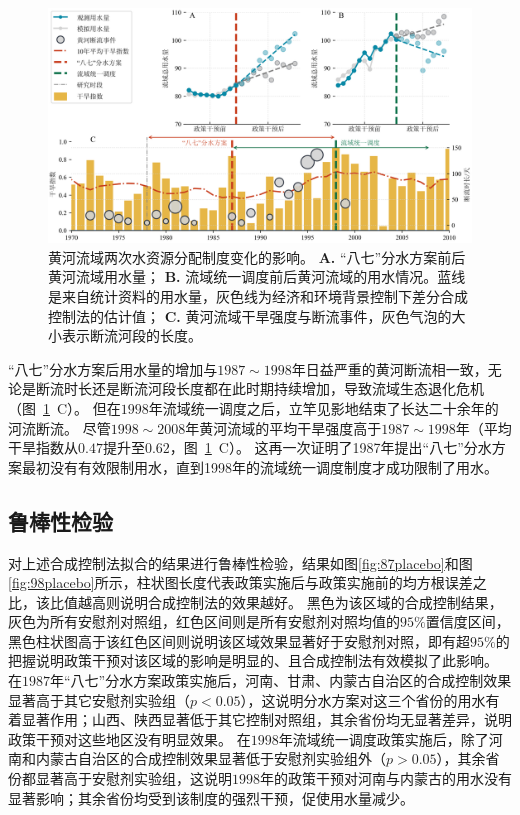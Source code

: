 \begin{figure}[!htb]
	\centering
	\includegraphics[width=\linewidth]{img/ch5/ch5_results.png}
	\caption[黄河流域两次水资源分配制度变化的影响]{
        黄河流域两次水资源分配制度变化的影响。
        \textbf{A.} “八七”分水方案前后黄河流域用水量；
        \textbf{B.} 流域统一调度前后黄河流域的用水情况。蓝线是来自统计资料的用水量，灰色线为经济和环境背景控制下差分合成控制法的估计值；
        \textbf{C.} 黄河流域干旱强度与断流事件，灰色气泡的大小表示断流河段的长度。
	}\label{ch5:fig:main_results}
\end{figure}

“八七”分水方案后用水量的增加与$1987 \sim 1998$年日益严重的黄河断流相一致，无论是断流时长还是断流河段长度都在此时期持续增加，导致流域生态退化危机（图~\ref{ch5:fig:main_results}~C）。
但在$1998$年流域统一调度之后，立竿见影地结束了长达二十余年的河流断流。
尽管$1998 \sim 2008$年黄河流域的平均干旱强度高于$1987 \sim 1998$年（平均干旱指数从$0.47$提升至$0.62$，图~\ref{ch5:fig:main_results}~C）。
这再一次证明了1987年提出“八七”分水方案最初没有有效限制用水，直到1998年的流域统一调度制度才成功限制了用水。

\subsection{鲁棒性检验}

对上述合成控制法拟合的结果进行鲁棒性检验，结果如图\ref{fig:87placebo}和图\ref{fig:98placebo}所示，柱状图长度代表政策实施后与政策实施前的均方根误差之比，该比值越高则说明合成控制法的效果越好。
黑色为该区域的合成控制结果，灰色为所有安慰剂对照组，红色区间则是所有安慰剂对照均值的$95\%$置信度区间，黑色柱状图高于该红色区间则说明该区域效果显著好于安慰剂对照，即有超$95\%$的把握说明政策干预对该区域的影响是明显的、且合成控制法有效模拟了此影响。
在$1987$年“八七”分水方案政策实施后，河南、甘肃、内蒙古自治区的合成控制效果显著高于其它安慰剂实验组（$p < 0.05$），这说明分水方案对这三个省份的用水有着显著作用；山西、陕西显著低于其它控制对照组，其余省份均无显著差异，说明政策干预对这些地区没有明显效果。
在$1998$年流域统一调度政策实施后，除了河南和内蒙古自治区的合成控制效果显著低于安慰剂实验组外（$p > 0.05$），其余省份都显著高于安慰剂实验组，这说明$1998$年的政策干预对河南与内蒙古的用水没有显著影响；其余省份均受到该制度的强烈干预，促使用水量减少。

